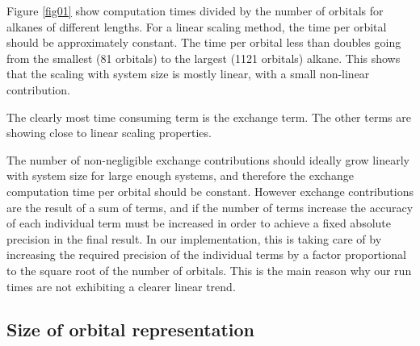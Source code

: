 \documentclass{article}
\begin{document}
Figure \ref{fig01} show computation times divided by the number of orbitals for alkanes of different lengths. For a linear scaling method, the time per orbital should be approximately constant.  The time per orbital less than doubles going from the smallest (81 orbitals) to the largest (1121 orbitals) alkane. This shows that the scaling with system size is mostly linear, with a small non-linear contribution.  



The clearly most time consuming term is the exchange term. The other terms are showing close to linear scaling properties.

The number of non-negligible exchange contributions should ideally grow linearly with system size for large enough systems, and therefore the exchange computation time per orbital should be constant. However exchange contributions are the result of a sum of terms, and if the number of terms increase the accuracy of each individual term must be increased in order to achieve a fixed absolute precision in the final result. In our implementation, this is taking care of by increasing the required precision of the individual terms by a factor proportional to the square root of the number of orbitals. This is the main reason why our run times are not exhibiting a clearer linear trend.


\subsection{Size of orbital representation}
\label{sizes}
\end{document}
